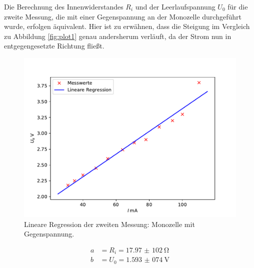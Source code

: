 \noindent Die Berechnung des Innenwiderstandes $R_{i}$ und der Leerlaufspannung $U_{0}$ für
die zweite Messung, die mit einer Gegenspannung an der Monozelle durchgeführt wurde,
erfolgen äquivalent. Hier ist zu erwähnen, dass die Steigung im Vergleich
zu Abbildung \ref{fig:plot1} genau andersherum verläuft, da der Strom nun in entgegengesetzte
Richtung fließt.

\begin{figure}[H]
  \centering
  \includegraphics{plot2.pdf}
  \caption{Lineare Regression der zweiten Messung: Monozelle mit Gegenspannung.}
  \label{fig:plot2}
\end{figure}

\begin{align*}
  a &= R_{i} = \SI{17,97(102)}{\ohm} \\
  b &= U_{0} = \SI{1,593(074)}{\volt}
\end{align*}

